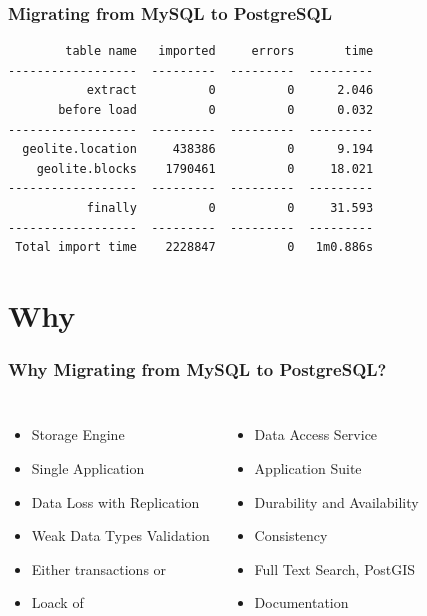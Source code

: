 \documentclass{beamer}
\begin{document}
\begin{frame}[fragile]
  \frametitle{Migrating from MySQL to PostgreSQL}
  
  \vfill

\begin{verbatim}
        table name   imported     errors       time
------------------  ---------  ---------  ---------
           extract          0          0      2.046
       before load          0          0      0.032
------------------  ---------  ---------  ---------
  geolite.location     438386          0      9.194
    geolite.blocks    1790461          0     18.021
------------------  ---------  ---------  ---------
           finally          0          0     31.593
------------------  ---------  ---------  ---------
 Total import time    2228847          0   1m0.886s
\end{verbatim}
\end{frame}

\section{Why}

\begin{frame}[fragile]
  \frametitle{Why Migrating from MySQL to PostgreSQL?}
  
  \vfill

\begin{columns}[c]


  \begin{itemize}
  \item Storage Engine
  \item Single Application
  \item Data Loss with Replication
  \item Weak Data Types Validation
  \item Either transactions or
  \item Loack of
  \end{itemize}



  \begin{itemize}
  \item Data Access Service
  \item Application Suite
  \item Durability and Availability
  \item Consistency
  \item Full Text Search, PostGIS
  \item Documentation
  \end{itemize}
\end{columns}
\end{frame}
\end{document}

